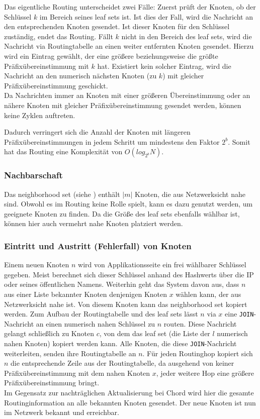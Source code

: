 Das eigentliche Routing unterscheidet zwei Fälle: Zuerst prüft der Knoten, ob der Schlüssel $k$ im Bereich seines leaf sets ist. Ist dies der Fall, wird die Nachricht an den entsprechenden Knoten gesendet. Ist dieser Knoten für den Schlüssel zuständig, endet das Routing. Fällt $k$ nicht in den Bereich des leaf sets, wird die Nachricht via Routingtabelle an einen weiter entfernten Knoten gesendet. Hierzu wird ein Eintrag gewählt, der eine größere beziehungsweise die größte Präfixübereinstimmung mit $k$ hat. Existiert kein solcher Eintrag, wird die Nachricht an den numerisch nächsten Knoten (zu $k$) mit gleicher Präfixübereinstimmung geschickt.\\
Da Nachrichten immer an Knoten mit einer größeren Übereinstimmung oder an nähere Knoten mit gleicher Präfixübereinstimmung gesendet werden, können keine Zyklen auftreten.

Dadurch verringert sich die Anzahl der Knoten mit längeren Präfixübereinstimmungen in jedem Schritt um mindestens den Faktor $2^b$. Somit hat das Routing eine Komplexität von $O(log_{2^b} N)$.

\subsubsection{Nachbarschaft}
Das neighborhood set (siehe ) enthält $|m|$ Knoten, die aus Netzwerksicht nahe sind. Obwohl es im Routing keine Rolle spielt, kann es dazu genutzt werden, um geeignete Knoten zu finden. Da die Größe des leaf sets ebenfalls wählbar ist, können hier auch vermehrt nahe Knoten platziert werden.

\subsubsection{Eintritt und Austritt (Fehlerfall) von Knoten}
Einem neuen Knoten $n$ wird von Applikationsseite ein frei wählbarer Schlüssel gegeben. Meist berechnet sich dieser Schlüssel anhand des Hashwerts über die IP oder seines öffentlichen Namens. Weiterhin geht das System davon aus, dass $n$ aus einer Liste bekannter Knoten denjenigen Knoten $x$ wählen kann, der aus Netzwerksicht nahe ist. Von diesem Knoten kann das neighborhood set kopiert werden. Zum Aufbau der Routingtabelle und des leaf sets lässt $n$ via $x$ eine \texttt{JOIN}-Nachricht an einen numerisch nahen Schlüssel zu $n$ routen. Diese Nachricht gelangt schließlich zu Knoten $c$, von dem das leaf set (die Liste der $l$ numerisch nahen Knoten) kopiert werden kann. Alle Knoten, die diese \texttt{JOIN}-Nachricht weiterleiten, senden ihre Routingtabelle an $n$. Für jeden Routinghop kopiert sich $n$ die entsprechende Zeile aus der Routingtabelle, da ausgehend von keiner Präfixübereinstimmung mit dem nahen Knoten $x$, jeder weitere Hop eine größere Präfixübereinstimmung bringt.\\
Im Gegensatz zur nachträglichen Aktualisierung bei Chord wird hier die gesamte Routinginformation an alle bekannten Knoten gesendet. Der neue Knoten ist nun im Netzwerk bekannt und erreichbar.

